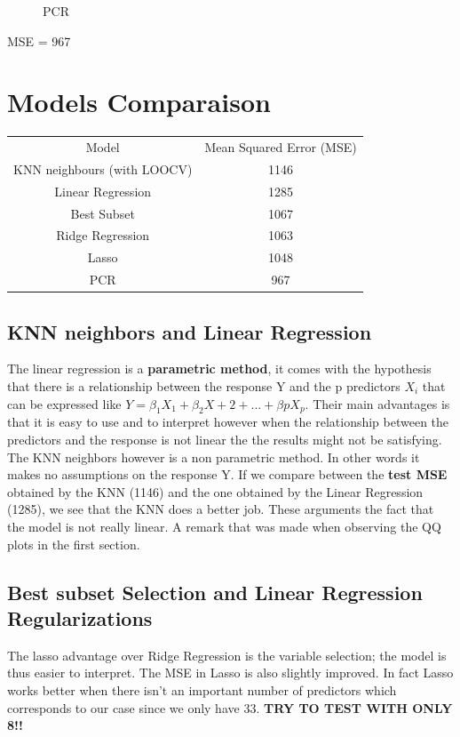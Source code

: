 \documentclass[]{report}
\newcommand{\inputtikz}[2]{%
	\scalebox{#1}{}  
}
\begin{document}
\begin{figure}[!h]
	\centering
	\inputtikz{0.5}{Figures/pcr_predicted.tex}
	\caption{PCR}
	\label{fig:pcr_predicted}
\end{figure}

MSE = 967

\section{Models Comparaison}
\begin{tabular}{c c}
	Model & Mean Squared Error (MSE) \\
	KNN neighbours (with LOOCV) & 1146\\ 
	Linear Regression & 1285\\
	Best Subset	& 1067\\
	Ridge Regression & 1063 \\	
	Lasso & 1048\\
	PCR & 967 \\
\end{tabular}
\subsection{KNN neighbors and Linear Regression}
 The linear regression is a \textbf{parametric method}, it comes with the hypothesis that there is a relationship between the response Y and the p predictors $X_{i}$ that can be expressed like $Y =\beta_{1}X_{1}+\beta_{2}X+{2}+...+\beta{p}X_{p}$. Their main advantages is that it is easy to use and to interpret however when the relationship between the predictors and the response is not linear the the results might not be satisfying. The KNN neighbors however is a non parametric method. In other words it makes no assumptions on the response Y. If we compare between the \textbf{test MSE} obtained by the KNN (1146) and the one obtained by the Linear Regression (1285), we see that the KNN does a better job. These arguments the fact that the model is not really linear. A remark that was made when observing the QQ plots in the first section. 
\subsection{Best subset Selection and Linear Regression Regularizations}
The lasso advantage over Ridge Regression is the variable selection; the model is thus easier to interpret. The MSE in Lasso is also slightly improved. In fact Lasso works better when there isn't an important number of predictors which corresponds to our case since we only have 33.
\textbf{TRY TO TEST WITH ONLY 8!!}
\end{document}
